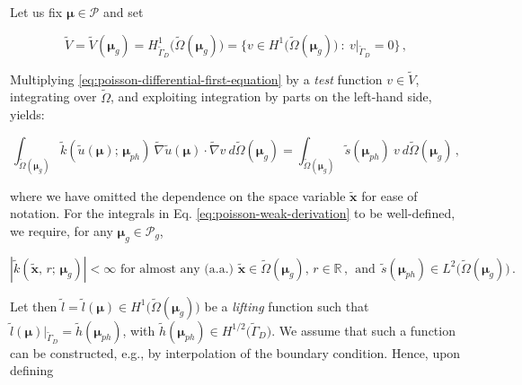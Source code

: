 \documentclass[longtitle]{elsarticle}
\numberwithin{equation}{section}
\theoremstyle{theorem}
\theoremstyle{definition}
\theoremstyle{remark}
\theoremstyle{proposition}
\numberwithin{figure}{section}
\newcommand{\wt}[1]{\widetilde{#1}}
\newcommand{\bg}[1]{\boldsymbol{#1}}
\begin{document}
		Let us fix $\bg{\mu} \in \mathcal{P}$ and set 
		\begin{linenomath}\begin{equation*}
			\wt{V} = \wt{V}(\bg{\mu}_g) = H^1_{\wt{\Gamma}_D} \big( \wt{\Omega}(\bg{\mu}_g) \big) = \big\lbrace v \in H^1 \big( \wt{\Omega}(\bg{\mu}_g) \big) ~ : ~ v \big\rvert_{\wt{\Gamma}_D} = 0 \big\rbrace \, ,
		\end{equation*}\end{linenomath}
		Multiplying \eqref{eq:poisson-differential-first-equation} by a \emph{test} function $v \in \wt{V}$, integrating over $\wt{\Omega}$, and exploiting integration by parts on the left-hand side, yields:
		\begin{linenomath}\begin{linenomath}\begin{equation}
			\label{eq:poisson-weak-derivation}
			\int_{\wt{\Omega}(\bg{\mu}_g)} \wt{k}(\wt{u}(\bg{\mu}); \, \bg{\mu}_{ph}) ~ \wt{\nabla} \wt{u}(\bg{\mu}) \cdot \wt{\nabla} v ~ d\wt{\Omega}(\bg{\mu}_g) = \int_{\wt{\Omega}(\bg{\mu}_g)} \wt{s}(\bg{\mu}_{ph}) ~ v ~ d\wt{\Omega}(\bg{\mu}_g) \, ,
		\end{equation}\end{linenomath}\end{linenomath}
		where we have omitted the dependence on the space variable $\wt{\bg{x}}$ for ease of notation. For the integrals in Eq. \eqref{eq:poisson-weak-derivation} to be well-defined, we require, for any $\bg{\mu}_g \in \mathcal{P}_g$, 
		\begin{linenomath}\begin{equation*}
			\text{$|\wt{k}(\wt{\bg{x}}, \, r; \, \bg{\mu}_g)| < \infty$ for almost any (a.a.) $\wt{\bg{x}} \in \wt{\Omega}(\bg{\mu}_g), \, r \in \mathbb{R}$} \, , ~~ \text{and} ~~ \wt{s}(\bg{\mu}_{ph}) \in L^2 \big( \wt{\Omega}(\bg{\mu}_g) \big) \, .
		\end{equation*}\end{linenomath}
		Let then $\wt{l} = \wt{l}(\bg{\mu}) \in H^1 \big( \wt{\Omega}(\bg{\mu}_g) \big)$ be a \emph{lifting} function such that $\wt{l}(\bg{\mu}) \big\rvert_{\wt{\Gamma}_D} = \wt{h}(\bg{\mu}_{ph})$, with $\wt{h}(\bg{\mu}_{ph}) \in H^{1/2} \big( \wt{\Gamma}_D \big)$. We assume that such a function can be constructed, e.g., by interpolation of the boundary condition. Hence, upon defining
\end{document}
